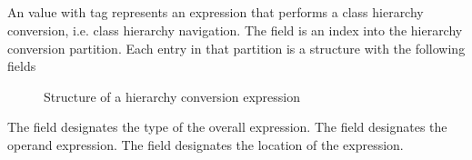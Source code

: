 

\subsection{}
\label{sec:ifc:ExprSort:HierarchyConversion}

An  value with tag  represents an expression that performs a class hierarchy conversion, i.e. class hierarchy navigation.
The  field is an index into the hierarchy conversion partition.  Each entry in that partition is a structure with the following fields
%
\begin{figure}[H]
	\centering
	\caption{Structure of a hierarchy conversion expression}
	\label{fig:ifc-hierarchy-conversion-expression-structure}
\end{figure}
%

The  field designates the type of the overall expression.
The field  designates the operand expression.
The field  designates the location of the expression.



\subsection{}
\label{sec:ifc:ExprSort:ProductTypeValue}

